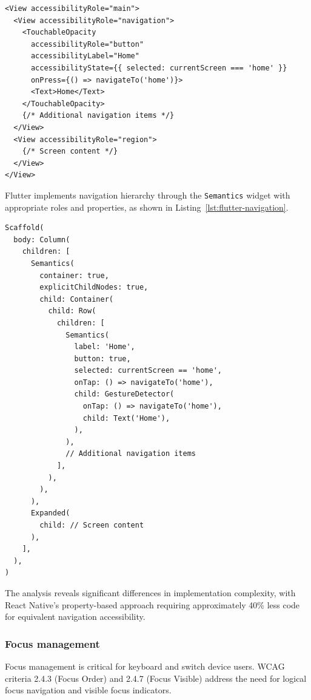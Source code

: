 {\begin{lstlisting}[style=ReactNativeStyle, caption=Navigation hierarchy in React Native, label=lst:react-native-navigation]
<View accessibilityRole="main">
  <View accessibilityRole="navigation">
    <TouchableOpacity
      accessibilityRole="button"
      accessibilityLabel="Home"
      accessibilityState={{ selected: currentScreen === 'home' }}
      onPress={() => navigateTo('home')}>
      <Text>Home</Text>
    </TouchableOpacity>
    {/* Additional navigation items */}
  </View>
  <View accessibilityRole="region">
    {/* Screen content */}
  </View>
</View>
\end{lstlisting}

Flutter implements navigation hierarchy through the \texttt{Semantics} widget with appropriate roles and properties, as shown in Listing~\ref{lst:flutter-navigation}.

\begin{lstlisting}[style=DartStyle, caption=Navigation hierarchy in Flutter, label=lst:flutter-navigation]
Scaffold(
  body: Column(
    children: [
      Semantics(
        container: true,
        explicitChildNodes: true,
        child: Container(
          child: Row(
            children: [
              Semantics(
                label: 'Home',
                button: true,
                selected: currentScreen == 'home',
                onTap: () => navigateTo('home'),
                child: GestureDetector(
                  onTap: () => navigateTo('home'),
                  child: Text('Home'),
                ),
              ),
              // Additional navigation items
            ],
          ),
        ),
      ),
      Expanded(
        child: // Screen content
      ),
    ],
  ),
)
\end{lstlisting}

The analysis reveals significant differences in implementation complexity, with React Native's property-based approach requiring approximately 40\% less code for equivalent navigation accessibility.

\subsubsection{Focus management}
\label{subsubsec:focus-management}

Focus management is critical for keyboard and switch device users. WCAG criteria 2.4.3 (Focus Order) and 2.4.7 (Focus Visible) address the need for logical focus navigation and visible focus indicators.

}
